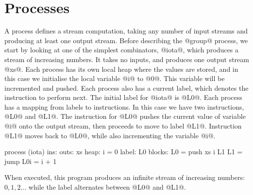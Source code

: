 \section{Processes}
\label{s:Processes}


A process defines a stream computation, taking any number of input streams and producing at least one output stream.
Before describing the @group@ process, we start by looking at one of the simplest combinators, @iota@, which produces a stream of increasing numbers.
It takes no inputs, and produces one output stream @xs@.
Each process has its own local heap where the values are stored, and in this case we initialise the local variable @i@ to @0@.
This variable will be incremented and pushed.
Each process also has a current label, which denotes the instruction to perform next.
The initial label for @iota@ is @L0@.
Each process has a mapping from labels to instructions.
In this case we have two instructions, @L0@ and @L1@.
The instruction for @L0@ pushes the current value of variable @i@ onto the output stream, then proceeds to move to label @L1@.
Instruction @L1@ moves back to @L0@, while also incrementing the variable @i@.

\begin{code}
process (iota)
     ins: 
    outs: xs
    heap: {i = 0}
   label: L0
  blocks: L0 = push xs i  L1
          L1 = jump       L0{i = i + 1}
\end{code}

When executed, this program produces an infinite stream of increasing numbers: $0, 1, 2\ldots$ while the label alternates between @L0@ and @L1@.

